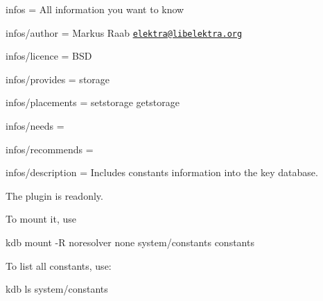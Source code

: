 
\begin{DoxyItemize}
\item infos = All information you want to know
\item infos/author = Markus Raab \href{mailto:elektra@libelektra.org}{\tt elektra@libelektra.\+org}
\item infos/licence = B\+S\+D
\item infos/provides = storage
\item infos/placements = setstorage getstorage
\item infos/needs =
\item infos/recommends =
\item infos/description = Includes constants information into the key database.
\end{DoxyItemize}

The plugin is readonly.

To mount it, use \begin{DoxyVerb}    kdb mount -R noresolver none system/constants constants
\end{DoxyVerb}


To list all constants, use\+: \begin{DoxyVerb}    kdb ls system/constants\end{DoxyVerb}
 